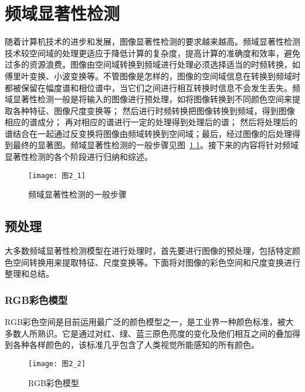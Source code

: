 

\chapter{频域显著性检测}
\label{cha2}

随着计算机技术的进步和发展，图像显著性检测的要求越来越高。频域显著性检测技术较空间域的处理更适应于降低计算的复杂度，提高计算的准确度和效率，避免过多的资源浪费。图像由空间域转换到频域进行处理必须选择适当的时频转换，如傅里叶变换、小波变换等。不管图像是怎样的，图像的空间域信息在转换到频域时都被保留在幅度谱和相位谱中，当它们之间进行相互转换时信息不会发生丢失。频域显著性检测一般是将输入的图像进行预处理，如将图像转换到不同颜色空间来提取各种特征、图像尺度变换等； 然后进行时频转换把图像转换到频域，得到图像相应的谱成分； 再对相应的谱进行一定的处理得到处理后的谱； 然后将处理后的谱结合在一起通过反变换将图像由频域转换到空间域；最后，经过图像的后处理得到最终的显著图。频域显著性检测的一般步骤见图~\ref{图2_1}。接下来的内容将针对频域显著性检测的各个阶段进行归纳和综述。

\begin{figure}[h]
  \centering
  \texttt{[image: 图2\_1]}
  \caption{频域显著性检测的一般步骤}
  \label{图2_1}    
\end{figure}

\section{预处理}
\label{2_1}

大多数频域显著性检测模型在进行处理时，首先要进行图像的预处理，包括特定颜色空间转换用来提取特征、尺度变换等。下面将对图像的彩色空间和尺度变换进行整理和总结。

\subsection{RGB彩色模型}
\label{2_1_1}

RGB彩色空间是目前运用最广泛的颜色模型之一，是工业界一种颜色标准，被大多数人所熟识。它是通过对红、绿、蓝三原色亮度的变化及他们相互之间的叠加得到各种各样颜色的，该标准几乎包含了人类视觉所能感知的所有颜色。

\begin{figure}[t]
  \centering
  \texttt{[image: 图2\_2]}
  \caption{RGB彩色模型}
  \label{图2_2}    
\end{figure}

